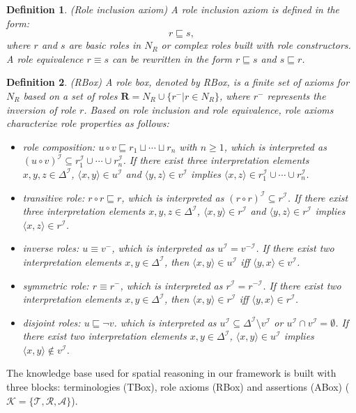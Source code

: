 \documentclass{article}
\newtheorem{mydef}{Definition}
\begin{document}
\begin{mydef}(Role inclusion axiom) 
 A role inclusion axiom is defined in the form:
 $$r\sqsubseteq s,$$
 where $r$ and $s$ are basic roles in $N_R$ or complex roles built with role constructors. A role equivalence $r\equiv s$ can be rewritten in the form $r\sqsubseteq s$ and $s\sqsubseteq r$.
\end{mydef}
\begin{mydef}(RBox)
A role box, denoted by RBox, is a finite set
of axioms for $N_R$  based on a set of roles $\mathbf{R}=N_R\cup\{r^-| r\in N_R\}$, where $r^-$  represents the inversion of role $r$.
Based on role inclusion and role equivalence, role axioms characterize role properties as follows:
\begin{itemize}
 \item role composition: $u\circ v \sqsubseteq r_1\sqcup \cdots\sqcup r_n$ with $n\geqslant 1$, which is interpreted as 
 $(u\circ v)^\mathcal{I} \subseteq r_1^\mathcal{I} \cup \cdots \cup r_n^\mathcal{I}$. If there exist three interpretation elements $x,y,z\in \Delta^\mathcal{I}$, 
 $\langle x,y \rangle \in u^\mathcal{I}$ and $\langle y,z \rangle \in v^\mathcal{I}$ implies  $\langle x,z \rangle \in r_1^\mathcal{I} \cup \cdots \cup r_n^\mathcal{I}$. 
 \item transitive role: $r\circ r \sqsubseteq r$, which is interpreted as $(r\circ r)^\mathcal{I} \subseteq r^\mathcal{I}$. If there exist three interpretation elements
 $x,y,z\in \Delta^\mathcal{I}$, $\langle x,y \rangle \in r^\mathcal{I}$ and $\langle y,z \rangle \in r^\mathcal{I}$ implies  $\langle x,z \rangle \in r^\mathcal{I}$.
 \item inverse roles: $u \equiv v^-$, which is interpreted as $u^\mathcal{I} = v^{-\mathcal{I}}$. If there exist two interpretation elements  $x,y\in \Delta^\mathcal{I}$,
 then $\langle x,y \rangle \in u^\mathcal{I}$ iff $\langle y,x \rangle \in v^\mathcal{I}$.
 \item symmetric role: $r \equiv r^-$, which is interpreted as $r^\mathcal{I} = r^{-\mathcal{I}}$. If there exist two interpretation elements  $x,y\in \Delta^\mathcal{I}$,
 then $\langle x,y \rangle \in r^\mathcal{I}$ iff $\langle y,x \rangle \in r^\mathcal{I}$.
 \item disjoint roles: $u\sqsubseteq \neg v$. which is interpreted as $u^\mathcal{I} \subseteq \Delta^\mathcal{I} \setminus v^\mathcal{I}$ or $u^\mathcal{I}\cap v^\mathcal{I}=\emptyset$. 
 If there exist two interpretation elements  $x,y\in \Delta^\mathcal{I}$, 
$\langle x,y \rangle \in u^\mathcal{I}$ implies $\langle x,y \rangle \notin v^\mathcal{I}$.
\end{itemize}
\end{mydef}
The knowledge base used for spatial reasoning in our framework is built with three blocks: terminologies (TBox), role axioms (RBox) and assertions (ABox)
($\mathcal{K}=\{\mathcal{T},\mathcal{R},\mathcal{A}\}$).
\end{document}
